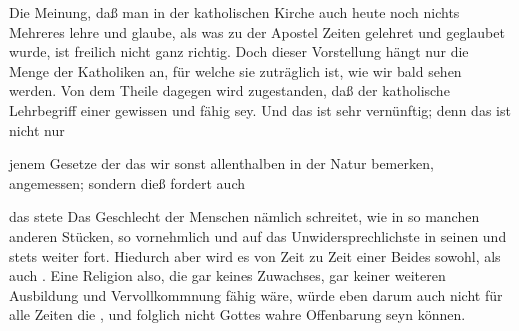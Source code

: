 Die Meinung, daß man in der katholischen Kirche auch heute noch nichts Mehreres lehre und glaube, als was zu der Apostel Zeiten gelehret und geglaubet wurde, ist freilich nicht ganz richtig. Doch dieser Vorstellung hängt nur die  Menge der Katholiken an, für welche sie zuträglich ist, wie wir bald sehen werden. Von dem  Theile dagegen wird zugestanden, daß der katholische Lehrbegriff einer gewissen  und  fähig sey. Und das ist sehr vernünftig; denn das ist nicht nur
\begin{aufzb}
\item jenem Gesetze der  das wir sonst allenthalben in der Natur bemerken, angemessen; sondern dieß fordert auch
\item das stete  Das Geschlecht der Menschen nämlich schreitet, wie in so manchen anderen Stücken, so vornehmlich und auf das Unwidersprechlichste in seinen  und  stets weiter fort. Hiedurch aber wird es von Zeit zu Zeit einer  Beides  sowohl, als auch . Eine Religion also, die gar keines Zuwachses, gar keiner weiteren Ausbildung und Vervollkommnung fähig wäre, würde eben darum auch nicht für alle Zeiten die , und folglich nicht Gottes wahre Offenbarung seyn können.
\end{aufzb}

